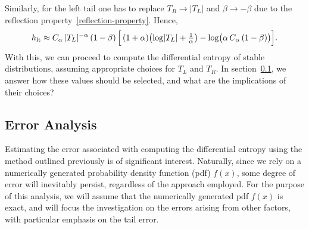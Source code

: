 \documentclass{article}
\theoremstyle{definition}
\begin{document}

Similarly, for the left tail one has to replace 
\(T_R\to\lvert T_{L}\rvert\)
and \(\beta\to-\beta\) due to the reflection property~\ref{reflection-property}. Hence,
\[
h_{\mathrm{lt}}
\approx
C_\alpha\,\lvert T_{L}\rvert^{-\alpha}\,(1-\beta)\,
\Bigl[\,(1+\alpha)\bigl(\log\lvert T_{L}\rvert+\tfrac{1}{\alpha}\bigr)
-\log\bigl(\alpha\,C_\alpha\,(1-\beta)\bigr)\Bigr].
\]
With this, we can proceed to compute the differential entropy of stable distributions, assuming appropriate choices for \( T_{L} \) and \( T_R \). In section~\ref{sec:error}, we answer how these values should be selected, and what are the implications of their choices?

\subsection{Error Analysis}
\label{sec:error}
Estimating the error associated with computing the differential entropy using the method outlined previously is of significant interest. Naturally, since we rely on a numerically generated probability density function (pdf) \( f(x) \), some degree of error will inevitably persist, regardless of the approach employed. For the purpose of this analysis, we will assume that the numerically generated pdf \( f(x) \) is exact, and will focus the investigation on the errors arising from other factors, with particular emphasis on the tail error.
\end{document}
